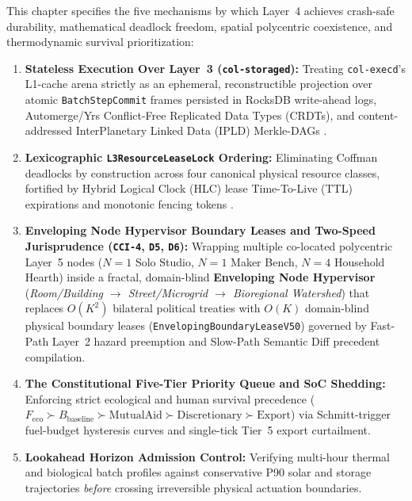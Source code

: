 This chapter specifies the five mechanisms by which Layer~4 achieves crash-safe durability,
mathematical deadlock freedom, spatial polycentric coexistence, and thermodynamic survival
prioritization:
\begin{enumerate}
\item \textbf{Stateless Execution Over Layer~3 (\texttt{col-storaged}):} Treating
        \texttt{col-execd}'s L1-cache arena strictly as an ephemeral, reconstructible
        projection over atomic \texttt{BatchStepCommit} frames persisted in RocksDB
        write-ahead logs, Automerge/Yrs Conflict-Free Replicated Data Types (CRDTs), and
        content-addressed InterPlanetary Linked Data (IPLD) Merkle-DAGs
        \parencite{shapiro2011crdt,kleppmann2017designing}.
\item \textbf{Lexicographic \texttt{L3ResourceLeaseLock} Ordering:} Eliminating Coffman
        deadlocks by construction across four canonical physical resource classes, fortified
        by Hybrid Logical Clock (HLC) lease Time-To-Live (TTL) expirations and monotonic
        fencing tokens \parencite{kulkarni2014logical}.
\item \textbf{Enveloping Node Hypervisor Boundary Leases and Two-Speed Jurisprudence (\texttt{CCI-4}, \texttt{D5}, \texttt{D6}):}
        Wrapping multiple co-located polycentric Layer~5 nodes ($N=1$ Solo Studio, $N=1$ Maker
        Bench, $N=4$ Household Hearth) inside a fractal, domain-blind \textbf{Enveloping Node
        Hypervisor} (\textit{Room/Building $\to$ Street/Microgrid $\to$ Bioregional
        Watershed}) that replaces $O(K^2)$ bilateral political treaties with $O(K)$
        domain-blind physical boundary leases (\texttt{EnvelopingBoundaryLeaseV50}) governed
        by Fast-Path Layer~2 hazard preemption and Slow-Path Semantic Diff precedent
        compilation.
\item \textbf{The Constitutional Five-Tier Priority Queue and SoC Shedding:} Enforcing
        strict ecological and human survival precedence ($F_{\mathrm{eco}} \succ B_{\mathrm{baseline}} \succ \mathrm{MutualAid} \succ \mathrm{Discretionary} \succ \mathrm{Export}$)
        via Schmitt-trigger fuel-budget hysteresis curves and single-tick Tier~5 export
        curtailment.
\item \textbf{Lookahead Horizon Admission Control:} Verifying multi-hour thermal and
        biological batch profiles against conservative P90 solar and storage trajectories
        \textit{before} crossing irreversible physical actuation boundaries.
\end{enumerate}

